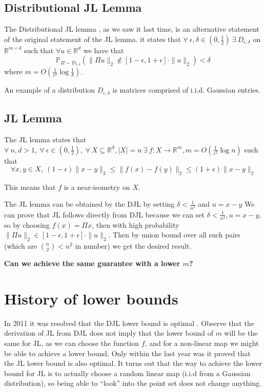 \documentclass[11pt]{article}
\newcommand{\R}{\mathbb{R}}
\newcommand{\Prob}{\mathbb{P}}
\begin{document}
\subsection{Distributional JL Lemma}

The Distributional JL lemma \cite{JL84}, as we saw it last time, is an alternative statement of the original statement of the JL lemma. it states that $\forall\ \epsilon, \delta \in (0, \frac{1}{2})\ \exists\ D_{\epsilon, \delta}$ on $\R^{m\times d}$ such that $\forall u \in \R^d$ we have that $$\Prob_{\Pi \sim D_{\epsilon, \delta}}(\|\Pi u\|_2\notin [1-\epsilon, 1+\epsilon]\cdot\|u\|_2)<\delta$$ where $m=O(\frac{1}{\epsilon^2}\log \frac{1}{\delta})$.

An example of a distribution $D_{\epsilon, \delta}$ is matrices comprised of i.i.d. Gaussian entries.

\subsection{JL Lemma}

The JL lemma \cite{JL84} states that $\forall\ n, d > 1,\ \forall\  \epsilon\in (0, \frac{1}{2}),\ \forall\ X \subseteq \R^d, |X|=n\ \exists\ f:X\rightarrow \R^m, m=O(\frac{1}{\epsilon^2}\log n)$ such that $$\forall x, y \in X,\ (1-\epsilon)\|x-y\|_2\leq\|f(x)-f(y)\|_2\leq(1+\epsilon)\|x-y\|_2$$

This means that $f$ is a near-isometry on $X$.

The JL lemma can be obtained by the DJL by setting $\delta<\frac{1}{n^2}$ and $u=x-y$
We can prove that JL follows directly from DJL because we can set $\delta<\frac{1}{n^2}, u=x-y$, so by choosing $f(x)=\Pi x$, then with high probability $\|\Pi u\|_2 \in [1-\epsilon, 1+\epsilon]\cdot\|u\|_2$. Then by union bound over all such pairs (which are $\binom{n}{2}<n^2$ in number) we get the desired result.

\textbf{Can we achieve the same guarantee with a lower $m$?}

\section{History of lower bounds}

In 2011 it was resolved that the DJL lower bound is optimal \cite{KMN11}. Observe that the derivation of JL from DJL does not imply that the lower bound of $m$ will be the same for JL, as we can choose the function $f$, and for a non-linear map we might be able to achieve a lower bound. Only within the last year was it proved that the JL lower bound is also optimal. It turns out that the way to achieve the lower bound for JL is to actually choose a random linear map (i.i.d from a Gaussian distribution), so being able to ``look'' into the point set does not change anything.
\end{document}
